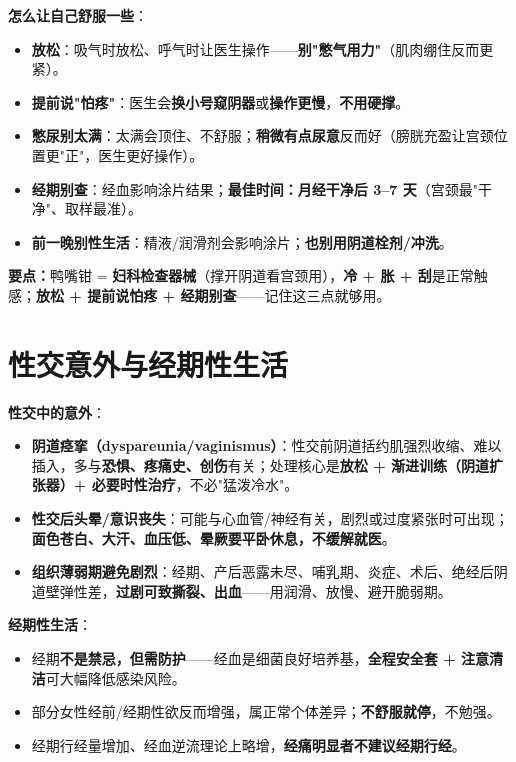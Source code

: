 \documentclass[12pt,UTF8,openany]{ctexbook}
\begin{document}
\noindent\textbf{怎么让自己舒服一些}：
\begin{itemize}[leftmargin=2em,itemsep=0.3em]
  \item \textbf{放松}：吸气时放松、呼气时让医生操作——\textbf{别"憋气用力"}（肌肉绷住反而更紧）。
  \item \textbf{提前说"怕疼"}：医生会\textbf{换小号窥阴器}或\textbf{操作更慢}，\textbf{不用硬撑}。
  \item \textbf{憋尿别太满}：太满会顶住、不舒服；\textbf{稍微有点尿意}反而好（膀胱充盈让宫颈位置更"正"，医生更好操作）。
  \item \textbf{经期别查}：经血影响涂片结果；\textbf{最佳时间：月经干净后 3--7 天}（宫颈最"干净"、取样最准）。
  \item \textbf{前一晚别性生活}：精液/润滑剂会影响涂片；\textbf{也别用阴道栓剂/冲洗}。
\end{itemize}

\noindent\textbf{要点：}鸭嘴钳 = \textbf{妇科检查器械}（撑开阴道看宫颈用），\textbf{冷 + 胀 + 刮}是正常触感；\textbf{放松 + 提前说怕疼 + 经期别查}——记住这三点就够用。

\section{性交意外与经期性生活}

\textbf{性交中的意外}：
\begin{itemize}[leftmargin=2em,itemsep=0.3em]
  \item \textbf{阴道痉挛（dyspareunia/vaginismus）}：性交前阴道括约肌强烈收缩、难以插入，多与\textbf{恐惧、疼痛史、创伤}有关；处理核心是\textbf{放松 + 渐进训练（阴道扩张器）+ 必要时性治疗}，不必"猛泼冷水"。
  \item \textbf{性交后头晕/意识丧失}：可能与心血管/神经有关，剧烈或过度紧张时可出现；\textbf{面色苍白、大汗、血压低、晕厥要平卧休息，不缓解就医}。
  \item \textbf{组织薄弱期避免剧烈}：经期、产后恶露未尽、哺乳期、炎症、术后、绝经后阴道壁弹性差，\textbf{过剧可致撕裂、出血}——用润滑、放慢、避开脆弱期。
\end{itemize}

\textbf{经期性生活}：
\begin{itemize}[leftmargin=2em,itemsep=0.3em]
  \item 经期\textbf{不是禁忌，但需防护}——经血是细菌良好培养基，\textbf{全程安全套 + 注意清洁}可大幅降低感染风险。
  \item 部分女性经前/经期性欲反而增强，属正常个体差异；\textbf{不舒服就停}，不勉强。
  \item 经期行经量增加、经血逆流理论上略增，\textbf{经痛明显者不建议经期行经}。
\end{itemize}
\end{document}
